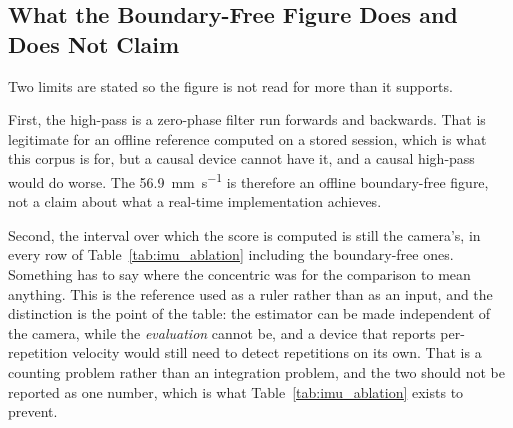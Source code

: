 \subsection{What the Boundary-Free Figure Does and Does Not Claim}
\label{sec:imu_limits}

Two limits are stated so the figure is not read for more than it supports.

First, the high-pass is a zero-phase filter run forwards and backwards. That is legitimate
for an offline reference computed on a stored session, which is what this corpus is for,
but a causal device cannot have it, and a causal high-pass would do worse. The
\SI{56.9}{\milli\metre\per\second} is therefore an offline boundary-free figure, not a
claim about what a real-time implementation achieves.

Second, the interval over which the score is computed is still the camera's, in every row
of Table~\ref{tab:imu_ablation} including the boundary-free ones. Something has to say
where the concentric was for the comparison to mean anything. This is the reference used as
a ruler rather than as an input, and the distinction is the point of the table: the
estimator can be made independent of the camera, while the \emph{evaluation} cannot be, and
a device that reports per-repetition velocity would still need to detect repetitions on its
own. That is a counting problem rather than an integration problem, and the two should not
be reported as one number, which is what Table~\ref{tab:imu_ablation} exists to prevent.
